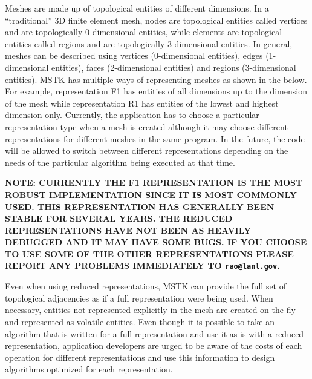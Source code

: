 \documentclass[12pt]{article}
\begin{document}
Meshes are made up of topological entities of different dimensions. In
a ``traditional'' 3D finite element mesh, nodes are topological
entities called vertices and are topologically 0-dimensional entities,
while elements are topological entities called regions and are
topologically 3-dimensional entities. In general, meshes can be
described using vertices (0-dimensional entities), edges
(1-dimensional entities), faces (2-dimensional entities) and regions
(3-dimensional entities). MSTK has multiple ways of representing
meshes as shown in the below. For example, representation F1 has
entities of all dimensions up to the dimension of the mesh while
representation R1 has entities of the lowest and highest dimension
only. Currently, the application has to choose a particular
representation type when a mesh is created although it may choose
different representations for different meshes in the same program. In
the future, the code will be allowed to switch between different
representations depending on the needs of the particular algorithm
being executed at that time.

{\bf NOTE: CURRENTLY THE F1 REPRESENTATION IS THE MOST ROBUST
  IMPLEMENTATION SINCE IT IS MOST COMMONLY USED. THIS REPRESENTATION
  HAS GENERALLY BEEN STABLE FOR SEVERAL YEARS. THE REDUCED
  REPRESENTATIONS HAVE NOT BEEN AS HEAVILY DEBUGGED AND IT MAY HAVE
  SOME BUGS. IF YOU CHOOSE TO USE SOME OF THE OTHER REPRESENTATIONS
  PLEASE REPORT ANY PROBLEMS IMMEDIATELY TO \texttt{rao@lanl.gov}.  }

Even when using reduced representations, MSTK can provide the full set
of topological adjacencies as if a full representation were being
used. When necessary, entities not represented explicitly in the mesh
are created on-the-fly and represented as volatile entities. Even
though it is possible to take an algorithm that is written for a full
representation and use it as is with a reduced representation,
application developers are urged to be aware of the costs of each
operation for different representations and use this information to
design algorithms optimized for each representation.
\end{document}
